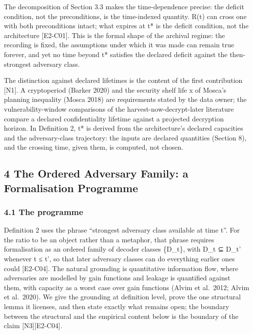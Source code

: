 \documentclass[
  11pt,
]{article}
\begin{document}
The decomposition of Section 3.3 makes the time-dependence precise: the
deficit condition, not the preconditions, is the time-indexed quantity.
R(t) can cross one with both preconditions intact; what expires at t* is
the deficit condition, not the architecture {[}E2-C01{]}. This is the
formal shape of the archival regime: the recording is fixed, the
assumptions under which it was made can remain true forever, and yet no
time beyond t* satisfies the declared deficit against the then-strongest
adversary class.

The distinction against declared lifetimes is the content of the first
contribution {[}N1{]}. A cryptoperiod (Barker 2020) and the security
shelf life x of Mosca's planning inequality (Mosca 2018) are
requirements stated by the data owner; the vulnerability-window
comparisons of the harvest-now-decrypt-later literature compare a
declared confidentiality lifetime against a projected decryption
horizon. In Definition 2, t* is derived from the architecture's declared
capacities and the adversary-class trajectory: the inputs are declared
quantities (Section 8), and the crossing time, given them, is computed,
not chosen.

\subsection{4 The Ordered Adversary Family: a Formalisation
Programme}\label{the-ordered-adversary-family-a-formalisation-programme}

\subsubsection{4.1 The programme}\label{the-programme}

Definition 2 uses the phrase ``strongest adversary class available at
time t''. For the ratio to be an object rather than a metaphor, that
phrase requires formalisation as an ordered family of decoder classes
\{D\_t\}, with D\_t ⊆ D\_t' whenever t ≤ t', so that later adversary
classes can do everything earlier ones could {[}E2-C04{]}. The natural
grounding is quantitative information flow, where adversaries are
modelled by gain functions and leakage is quantified against them, with
capacity as a worst case over gain functions (Alvim et al.~2012; Alvim
et al.~2020). We give the grounding at definition level, prove the one
structural lemma it licenses, and then state exactly what remains open;
the boundary between the structural and the empirical content below is
the boundary of the claim {[}N3{]}{[}E2-C04{]}.
\end{document}
